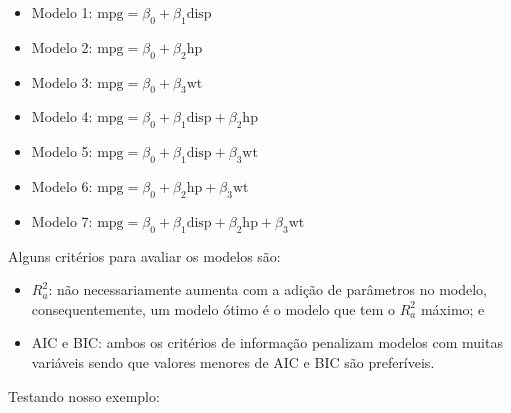 \documentclass[
]{book}
\providecommand{\tightlist}{%
  \setlength{\itemsep}{0pt}\setlength{\parskip}{0pt}}
\begin{document}
\begin{itemize}
\tightlist
\item
  Modelo 1: \(\text{mpg} = \beta_0+\beta_1\text{disp}\)
\item
  Modelo 2: \(\text{mpg} = \beta_0+\beta_2\text{hp}\)
\item
  Modelo 3: \(\text{mpg} = \beta_0+\beta_3\text{wt}\)
\item
  Modelo 4: \(\text{mpg} = \beta_0+\beta_1\text{disp}+\beta_2\text{hp}\)
\item
  Modelo 5: \(\text{mpg} = \beta_0+\beta_1\text{disp}+\beta_3\text{wt}\)
\item
  Modelo 6: \(\text{mpg} = \beta_0+\beta_2\text{hp}+\beta_3\text{wt}\)
\item
  Modelo 7: \(\text{mpg} = \beta_0+\beta_1\text{disp}+\beta_2\text{hp}+\beta_3\text{wt}\)
\end{itemize}

Alguns critérios para avaliar os modelos são:

\begin{itemize}
\tightlist
\item
  \(R_a^2\): não necessariamente aumenta com a adição de parâmetros no modelo, consequentemente, um modelo ótimo é o modelo que tem o \(R_a^2\) máximo; e
\item
  AIC e BIC: ambos os critérios de informação penalizam modelos com muitas variáveis sendo que valores menores de AIC e BIC são preferíveis.
\end{itemize}

Testando nosso exemplo:
\end{document}
